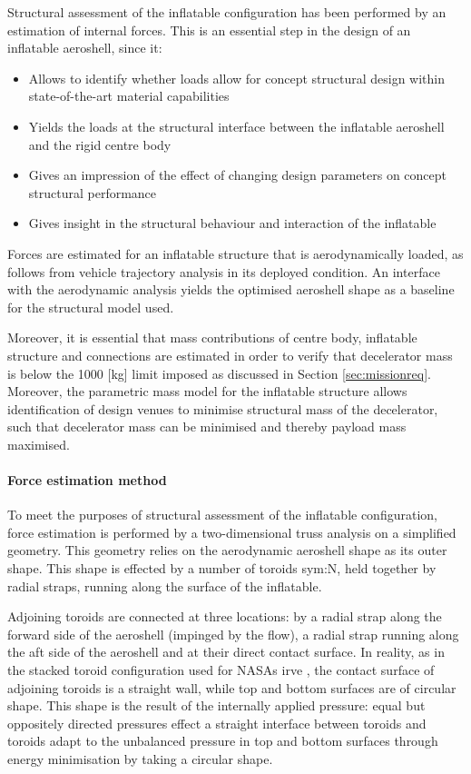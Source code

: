 Structural assessment of the inflatable configuration has been performed by an estimation of internal forces. This is an essential step in the design of an inflatable aeroshell, since it:
\begin{itemize}
\item Allows to identify whether loads allow for concept structural design within state-of-the-art material capabilities
\item Yields the loads at the structural interface between the inflatable aeroshell and the rigid centre body
\item Gives an impression of the effect of changing design parameters on concept structural performance
\item Gives insight in the structural behaviour and interaction of the inflatable
\end{itemize}
Forces are estimated for an inflatable structure that is aerodynamically loaded, as follows from vehicle trajectory analysis in its deployed condition. An interface with the aerodynamic analysis yields the optimised aeroshell shape as a baseline for the structural model used. 

Moreover, it is essential that mass contributions of centre body, inflatable structure and connections are estimated in order to verify that decelerator mass is below the 1000 [kg] limit imposed as discussed in Section \ref{sec:missionreq}. Moreover, the parametric mass model for the inflatable structure allows identification of design venues to minimise structural mass of the decelerator, such that decelerator mass can be minimised and thereby payload mass maximised. 

\paragraph{Force estimation method}

To meet the purposes of structural assessment of the inflatable configuration, force estimation is performed by a two-dimensional truss analysis on a simplified geometry. This geometry relies on the aerodynamic aeroshell shape as its outer shape. This shape is effected by a number of toroids \gls{sym:N}, held together by radial straps, running along the surface of the inflatable. 

Adjoining toroids are connected at three locations: by a radial strap along the forward side of the aeroshell (impinged by the flow), a radial strap running along the aft side of the aeroshell and at their direct contact surface. In reality, as in the stacked toroid configuration used for NASAs \gls{irve} \cite{Lindell2006}, the contact surface of adjoining toroids is a straight wall, while top and bottom surfaces are of circular shape. This shape is the result of the internally applied pressure: equal but oppositely directed pressures effect a straight interface between toroids and toroids adapt to the unbalanced pressure in top and bottom surfaces through energy minimisation by taking a circular shape.

